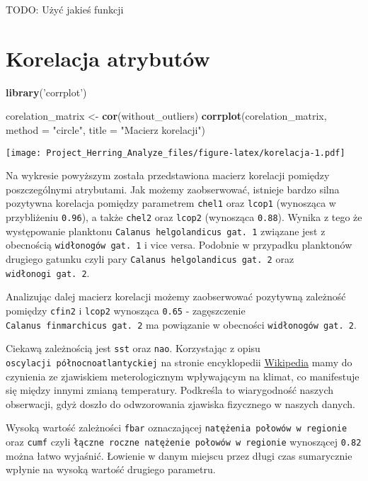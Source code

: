 \documentclass[]{article}
\newenvironment{Shaded}{\begin{snugshade}}{\end{snugshade}}
\newcommand{\DataTypeTok}[1]{\textcolor[rgb]{0.13,0.29,0.53}{#1}}
\newcommand{\KeywordTok}[1]{\textcolor[rgb]{0.13,0.29,0.53}{\textbf{#1}}}
\newcommand{\NormalTok}[1]{#1}
\newcommand{\StringTok}[1]{\textcolor[rgb]{0.31,0.60,0.02}{#1}}
\begin{document}
TODO: Użyć jakieś funkcji

\hypertarget{korelacja-atrybutuxf3w}{%
\section{Korelacja atrybutów}\label{korelacja-atrybutuxf3w}}

\begin{Shaded}
\begin{Highlighting}[]
\KeywordTok{library}\NormalTok{(}\StringTok{'corrplot'}\NormalTok{)}

\NormalTok{corelation_matrix <-}\StringTok{ }\KeywordTok{cor}\NormalTok{(without_outliers)}
\KeywordTok{corrplot}\NormalTok{(corelation_matrix, }\DataTypeTok{method =} \StringTok{"circle"}\NormalTok{, }\DataTypeTok{title =} \StringTok{"Macierz korelacji"}\NormalTok{)}
\end{Highlighting}
\end{Shaded}

\texttt{[image: Project\_Herring\_Analyze\_files/figure-latex/korelacja-1.pdf]}

Na wykresie powyższym została przedstawiona macierz korelacji pomiędzy
poszczególnymi atrybutami. Jak możemy zaobserwować, istnieje bardzo
silna pozytywna korelacja pomiędzy parametrem \texttt{chel1} oraz
\texttt{lcop1} (wynosząca w przybliżeniu \texttt{0.96}), a także
\texttt{chel2} oraz \texttt{lcop2} (wynosząca \texttt{0.88}). Wynika z
tego że występowanie planktonu \texttt{Calanus\ helgolandicus\ gat.\ 1}
związane jest z obecnością \texttt{widłonogów\ gat.\ 1} i vice versa.
Podobnie w przypadku planktonów drugiego gatunku czyli pary
\texttt{Calanus\ helgolandicus\ gat.\ 2} oraz
\texttt{widłonogi\ gat.\ 2}.

Analizując dalej macierz korelacji możemy zaobserwować pozytywną
zależność pomiędzy \texttt{cfin2} i \texttt{lcop2} wynosząca
\texttt{0.65} - zagęszczenie \texttt{Calanus\ finmarchicus\ gat.\ 2} ma
powiązanie w obecności \texttt{widłonogów\ gat.\ 2}.

Ciekawą zależnością jest \texttt{sst} oraz \texttt{nao}. Korzystając z
opisu \texttt{oscylacji\ północnoatlantyckiej} na stronie encyklopedii
\href{https://pl.wikipedia.org/wiki/Oscylacja_p\%C3\%B3\%C5\%82nocnoatlantycka}{Wikipedia}
mamy do czynienia ze zjawiskiem meterologicznym wpływającym na klimat,
co manifestuje się między innymi zmianą temperatury. Podkreśla to
wiarygodność naszych obserwacji, gdyż doszło do odwzorowania zjawiska
fizycznego w naszych danych.

Wysoką wartość zależności \texttt{fbar} oznaczającej
\texttt{natężenia\ połowów\ w\ regionie} oraz \texttt{cumf} czyli
\texttt{łączne\ roczne\ natężenie\ połowów\ w\ regionie} wynoszącej
\texttt{0.82} można łatwo wyjaśnić. Łowienie w danym miejscu przez długi
czas sumarycznie wpłynie na wysoką wartość drugiego parametru.
\end{document}
